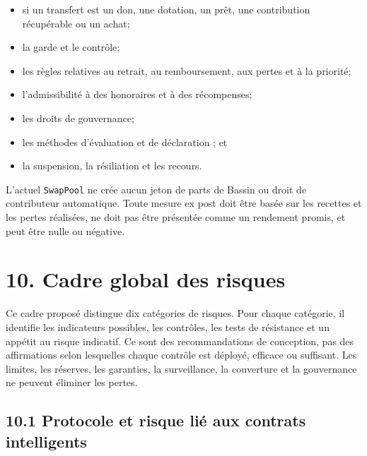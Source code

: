 \documentclass[11pt]{article}
\begin{document}
\begin{itemize}[leftmargin=*]
\item si un transfert est un don, une dotation, un prêt, une contribution récupérable ou un achat;
\item la garde et le contrôle;
\item les règles relatives au retrait, au remboursement, aux pertes et à la priorité;
\item l'admissibilité à des honoraires et à des récompenses;
\item les droits de gouvernance;
\item les méthodes d'évaluation et de déclaration ; et
\item la suspension, la résiliation et les recours.
\end{itemize}
L'actuel \texttt{SwapPool} ne crée aucun jeton de parts de Bassin ou droit de contributeur automatique. Toute mesure ex post doit être basée sur les recettes et les pertes réalisées, ne doit pas être présentée comme un rendement promis, et peut être nulle ou négative.


\section*{10. Cadre global des risques}

Ce cadre proposé distingue dix catégories de risques. Pour chaque catégorie, il identifie les indicateurs possibles, les contrôles, les tests de résistance et un appétit au risque indicatif. Ce sont des recommandations de conception, pas des affirmations selon lesquelles chaque contrôle est déployé, efficace ou suffisant. Les limites, les réserves, les garanties, la surveillance, la couverture et la gouvernance ne peuvent éliminer les pertes.

\subsection*{10.1 Protocole et risque lié aux contrats intelligents}
\end{document}
